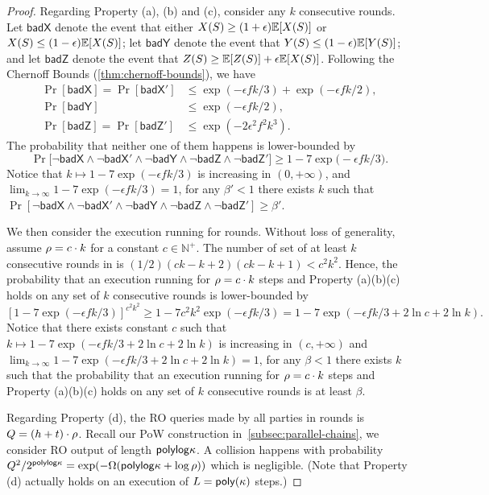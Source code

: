 \begin{proof}
    Regarding Property (a), (b) and (c), consider any $k$ consecutive rounds.
    Let $\mathsf{badX}$ denote the event that either $X(S) \ge (1 + \epsilon) \mathbb{E}[X(S)]$ or $X(S) \le (1 - \epsilon) \mathbb{E}[X(S)]$; let $\mathsf{badY}$ denote the event that $Y(S) \le (1 - \epsilon) \mathbb{E}[Y(S)]$; and let $\mathsf{badZ}$ denote the event that $Z(S) \ge \mathbb{E}[Z(S)] + \epsilon \mathbb{E}[X(S)]$.
    Following the Chernoff Bounds (\cref{thm:chernoff-bounds}), we have
    \begin{align*}
        \Pr[\mathsf{badX}] = \Pr[\mathsf{badX}'] & \le \exp(-\epsilon f k / 3) + \exp(-\epsilon f k / 2),
        \\
        \Pr[\mathsf{badY}]                       & \le \exp(-\epsilon f k / 2),
        \\
        \Pr[\mathsf{badZ}] = \Pr[\mathsf{badZ}'] & \le \exp(-2\epsilon^2 f^2 k^3).
    \end{align*}
    The probability that neither one of them happens is lower-bounded by
    \[ \Pr \big[\neg \mathsf{badX} \wedge \neg \mathsf{badX}' \wedge \neg \mathsf{badY} \wedge \neg \mathsf{badZ} \wedge \neg \mathsf{badZ}' \big] \ge 1 - 7\exp \big( -\epsilon f k / 3 \big). \]
    Notice that $k \mapsto 1 - 7 \exp(-\epsilon f k / 3)$ is increasing in $(0, +\infty)$, and $\lim_{k \rightarrow \infty} 1 - 7 \exp(-\epsilon f k / 3) = 1$, for any $\beta' < 1$ there exists $k$ such that $\Pr[\neg \mathsf{badX} \wedge \neg \mathsf{badX}' \wedge \neg \mathsf{badY} \wedge \neg \mathsf{badZ} \wedge \neg \mathsf{badZ}'] \ge \beta'$.

    We then consider the execution running for \phaseLength rounds.
    Without loss of generality, assume $\rho = c \cdot k$ for a constant $c \in \mathbb{N}^+$.
    The number of set of at least $k$ consecutive rounds in \phaseLength is $(1/2)(ck - k +2)(ck - k +1) < c^2k^2$.
    Hence, the probability that an execution running for $\rho = c \cdot k$ steps and Property (a)(b)(c) holds on any set of $k$ consecutive rounds is lower-bounded by
    \[ [1 - 7\exp(-\epsilon f k / 3)]^{c^2 k^2} \ge 1 - 7c^2 k^2 \exp(-\epsilon f k / 3) = 1 - 7\exp(-\epsilon f k / 3 + 2\ln c + 2\ln k). \]
    Notice that there exists constant $c$ such that $k \mapsto 1 - 7\exp(-\epsilon f k / 3 + 2\ln c + 2\ln k)$ is increasing in $(c, +\infty)$ and $\lim_{k \rightarrow \infty} 1 - 7\exp(-\epsilon f k / 3 + 2\ln c + 2\ln k) = 1$, for any $\beta < 1$ there exists $k$ such that the probability that an execution running for $\rho = c \cdot k$ steps and Property (a)(b)(c) holds on any set of $k$ consecutive rounds is at least $\beta$.

    Regarding Property (d), the RO queries made by all parties in \phaseLength rounds is $Q = (h + t) \cdot \rho$.
    Recall our \mforone PoW construction in~\cref{subsec:parallel-chains}, we consider RO output of length $\mathsf{polylog} \kappa$.
    A collision happens with probability $Q^2 / 2^{\mathsf{polylog} \kappa} = \exp(-\Omega(\mathsf{polylog} \kappa + \log \rho))$ which is negligible.
    (Note that Property (d) actually holds on an execution of $L = \mathsf{poly} (\kappa)$ steps.)
\end{proof}

